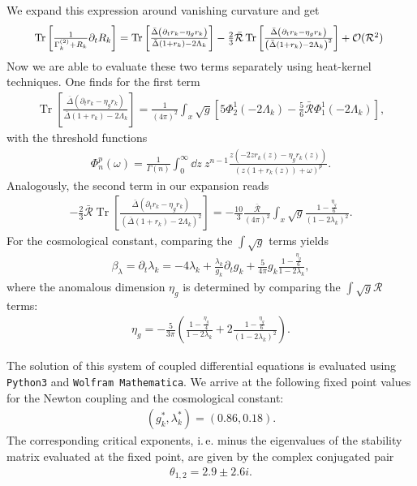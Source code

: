 We expand this expression around vanishing curvature and get
\begin{align}
\resizebox{.9 \textwidth}{!}{$
\operatorname{Tr}\left[\frac{1}{\Gammak^{(2)} + R_k}\partial_t R_k\right] = \operatorname{Tr}\left[\frac{\bar{\Delta}\left(\partial_t r_k - \eta_g r_k\right)}{\bar{\Delta}(1+r_k)-2\Lambda_k}\right] - \frac{2}{3}\bar{\mathcal{R}}\operatorname{Tr}\left[\frac{\bar{\Delta}\left(\partial_t r_k - \eta_g r_k\right)}{\left(\bar{\Delta}(1+r_k)-2\Lambda_k\right)^2}\right] + \mathcal{O}(\mathcal{R}^2)$
}
\end{align}
Now we are able to evaluate these two terms separately using heat-kernel techniques. One finds for the first term
\begin{align}
\operatorname{Tr}\left[\frac{\bar{\Delta}\left(\partial_t r_k - \eta_g r_k\right)}{\bar{\Delta}(1+r_k)-2\Lambda_k}\right] = \frac{1}{(4\pi)^2}\int_x \sqrt{g} \left[5\Phi_2^1(-2\Lambda_k) - \frac{5}{6}\bar{\mathcal{R}}\Phi^1_1(-2\Lambda_k)\right],
\end{align}
with the threshold functions 
\begin{align}
	\Phi_n^p(\omega) = \frac{1}{\Gamma(n)}\int_0^{\infty}\dd z \ z^{n-1} \frac{z(-2zr_k(z)-\eta_gr_k(z))}{(z(1+r_k(z))+\omega)^p}.
\end{align}
Analogously, the second term in our expansion reads
\begin{align}
	-\frac{2}{3}\bar{\mathcal{R}}\operatorname{Tr}\left[\frac{\bar{\Delta}\left(\partial_t r_k - \eta_g r_k\right)}{\left(\bar{\Delta}(1+r_k)-2\Lambda_k\right)^2}\right] = -\frac{10}{3}\frac{\bar{\mathcal{R}}}{(4\pi)^2}\int_x  \sqrt{g} \frac{1-\frac{\eta_g}{6}}{(1-2\lambda_k)^2}.
\end{align}
For the cosmological constant, comparing the $\int\sqrt{g}$ terms yields
\begin{align}
	\beta_{\lambda} = \partial_t\lambda_k = -4\lambda_k + \frac{\lambda_k}{g_k} \partial_t g_k + \frac{5}{4\pi}g_k\frac{1-\frac{\eta_g}{6}}{1-2\lambda_k},
\end{align}
where the anomalous dimension $\eta_g$ is determined by comparing the $\int\sqrt{g}\mathcal{R}$ terms:
\begin{align}
\eta_g = -\frac{5}{3\pi} \left(\frac{1-\frac{\eta_g}{4}}{1-2\lambda_k} + 2\frac{1-\frac{\eta_g}{6}}{(1-2\lambda_k)^2}\right).	
\end{align}

The solution of this system of coupled differential equations is evaluated using \verb|Python3| and \verb|Wolfram Mathematica|. We arrive at the following fixed point values for the Newton coupling and the cosmological constant:
\begin{align}
	(g_k^*, \lambda_k^*) = (0.86, 0.18).
\end{align}
The corresponding critical exponents, i.\,e. minus the eigenvalues of the stability matrix evaluated at the fixed point, are given by the complex conjugated pair
\begin{align}
	\theta_{1,2} = 2.9 \pm 2.6i. 
\end{align}

